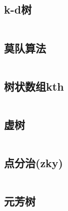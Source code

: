 \documentclass[landscape, twoside, a4paper]{article}
\newcommand{\cppcode}[1]{
	\inputminted[mathescape,
	frame=lines,linenos]{cpp}{source/#1}
}
\begin{document}
\begin{multicols}{2}
\begin{spacing}{0.8}


\subsection{k-d树}

\cppcode{data-structure/kd-tree.cpp}



\subsection{莫队算法}

\cppcode{data-structure/mo-team.cpp}







\subsection{树状数组kth}

\cppcode{data-structure/fenwicktree.cpp}


\subsection{虚树}

\cppcode{data-structure/virtualtree.cpp}


\subsection{点分治(zky)}

\cppcode{data-structure/pointdivide.cpp}


\subsection{元芳树}

\cppcode{data-structure/yuanfang.cpp}




\end{spacing}
\end{multicols}
\end{document}
